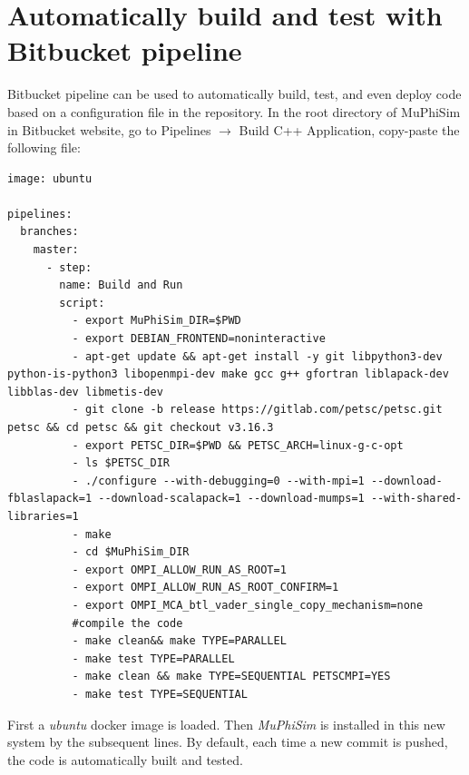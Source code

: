 \documentclass[oneside,11pt,times]{book}
\begin{document}
\section{Automatically build and test with Bitbucket pipeline}
Bitbucket pipeline can be used to automatically build, test, and even deploy code based on a configuration file in the repository. In the root directory of MuPhiSim in Bitbucket website, go to Pipelines $\rightarrow$ Build C++ Application, copy-paste the following file:
\begin{lstlisting}
image: ubuntu

pipelines:
  branches:
    master:
	  - step:
	    name: Build and Run
		script:
		  - export MuPhiSim_DIR=$PWD
		  - export DEBIAN_FRONTEND=noninteractive
		  - apt-get update && apt-get install -y git libpython3-dev python-is-python3 libopenmpi-dev make gcc g++ gfortran liblapack-dev libblas-dev libmetis-dev
		  - git clone -b release https://gitlab.com/petsc/petsc.git petsc && cd petsc && git checkout v3.16.3
		  - export PETSC_DIR=$PWD && PETSC_ARCH=linux-g-c-opt
		  - ls $PETSC_DIR
		  - ./configure --with-debugging=0 --with-mpi=1 --download-fblaslapack=1 --download-scalapack=1 --download-mumps=1 --with-shared-libraries=1
		  - make
		  - cd $MuPhiSim_DIR
		  - export OMPI_ALLOW_RUN_AS_ROOT=1
		  - export OMPI_ALLOW_RUN_AS_ROOT_CONFIRM=1
		  - export OMPI_MCA_btl_vader_single_copy_mechanism=none
		  #compile the code
		  - make clean&& make TYPE=PARALLEL
		  - make test TYPE=PARALLEL
		  - make clean && make TYPE=SEQUENTIAL PETSCMPI=YES
		  - make test TYPE=SEQUENTIAL
\end{lstlisting}
First a \emph{ubuntu} docker image is loaded. Then \textit{MuPhiSim} is installed in this new system by the subsequent lines. By default, each time a new commit is pushed, the code is automatically built and tested.
\end{document}

